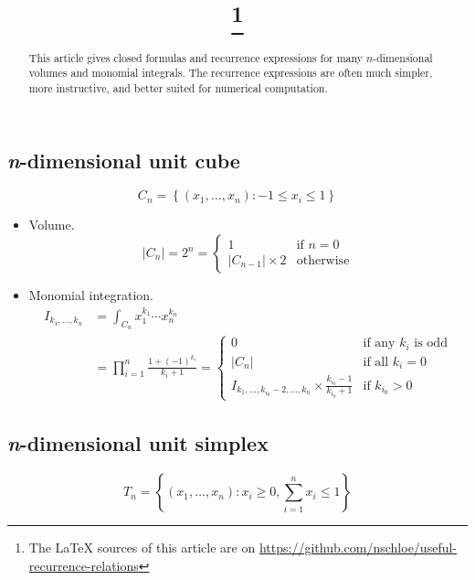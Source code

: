 \documentclass[draft]{scrartcl}
\title{\mytitle\footnote{The LaTeX sources of this article are on
\url{https://github.com/nschloe/useful-recurrence-relations}}}
\author{\myauthor}
\begin{document}
\maketitle
\begin{abstract}
  This article gives closed formulas and recurrence expressions for many $n$-dimensional
  volumes and monomial integrals. The recurrence expressions are often much simpler,
  more instructive, and better suited for numerical computation.
\end{abstract}

\subsection*{\textit{n}-dimensional unit cube}
\[
  C_n = \left\{(x_1,\dots,x_n): -1 \le x_i \le 1\right\}
\]

\begin{itemize}
  \item Volume.
    \begin{equation}
      |C_n| = 2^n = \begin{cases}
        1&\text{if $n=0$}\\
        |C_{n-1}| \times 2&\text{otherwise}
      \end{cases}
    \end{equation}
  \item Monomial integration.
  \begin{align}\nonumber
    I_{k_1,\dots,k_n}
    &= \int_{C_n} x_1^{k_1}\cdots x_n^{k_n}\\
      &= \prod_{i=1}^n \frac{1 + (-1)^{k_i}}{k_i+1}
    =\begin{cases}
      0&\text{if any $k_i$ is odd}\\
      |C_n|&\text{if all $k_i=0$}\\
      I_{k_1,\dots,k_{i_0}-2,\dots,k_n} \times \frac{k_{i_0}-1}{k_{i_0}+1}&\text{if $k_{i_0} > 0$}
    \end{cases}
  \end{align}
\end{itemize}

\subsection*{\textit{n}-dimensional unit simplex}
\[
  T_n = \left\{(x_1,\dots,x_n):x_i \geq 0, \sum_{i=1}^n x_i \leq 1\right\}
\]
\end{document}
